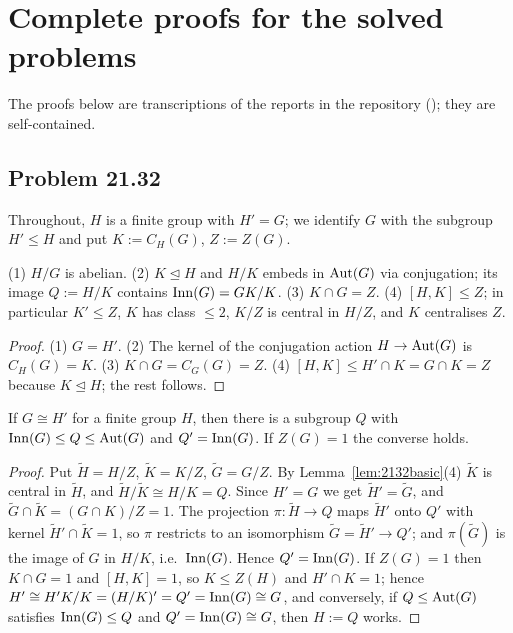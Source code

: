\section{Complete proofs for the solved problems}\label{app:proofs}

The proofs below are transcriptions of the reports in the repository (); they are
self-contained.

\subsection{Problem 21.32}\label{app:2132}

Throughout, $H$ is a finite group with $H'=G$; we identify $G$ with the subgroup $H'\le H$ and put $K:=C_H(G)$,
$Z:=Z(G)$.

\begin{lemma}\label{lem:2132basic}
(1) $H/G$ is abelian. (2) $K\trianglelefteq H$ and $H/K$ embeds in $\operatorname{Aut}(G)$ via conjugation; its image $Q:=H/K$
contains $\operatorname{Inn}(G)=GK/K$. (3) $K\cap G=Z$. (4) $[H,K]\le Z$; in particular $K'\le Z$, $K$ has class $\le 2$, $K/Z$ is
central in $H/Z$, and $K$ centralises $Z$.
\end{lemma}
\begin{proof}
(1) $G=H'$. (2) The kernel of the conjugation action $H\to\operatorname{Aut}(G)$ is $C_H(G)=K$. (3) $K\cap G=C_G(G)=Z$.
(4) $[H,K]\le H'\cap K=G\cap K=Z$ because $K\trianglelefteq H$; the rest follows.
\end{proof}

\begin{theorem}\label{thm:2132B}
If $G\cong H'$ for a finite group $H$, then there is a subgroup $Q$ with $\operatorname{Inn}(G)\le Q\le\operatorname{Aut}(G)$ and
$Q'=\operatorname{Inn}(G)$. If $Z(G)=1$ the converse holds.
\end{theorem}
\begin{proof}
Put $\tilde H=H/Z$, $\tilde K=K/Z$, $\tilde G=G/Z$. By Lemma~\ref{lem:2132basic}(4) $\tilde K$ is central in
$\tilde H$, and $\tilde H/\tilde K\cong H/K=Q$. Since $H'=G$ we get $\tilde H'=\tilde G$, and
$\tilde G\cap\tilde K=(G\cap K)/Z=1$. The projection $\pi:\tilde H\to Q$ maps $\tilde H'$ onto $Q'$ with kernel
$\tilde H'\cap\tilde K=1$, so $\pi$ restricts to an isomorphism $\tilde G=\tilde H'\to Q'$; and $\pi(\tilde G)$
is the image of $G$ in $H/K$, i.e.\ $\operatorname{Inn}(G)$. Hence $Q'=\operatorname{Inn}(G)$.
If $Z(G)=1$ then $K\cap G=1$ and $[H,K]=1$, so $K\le Z(H)$ and $H'\cap K=1$; hence $H'\cong H'K/K=(H/K)'=Q'=\operatorname{Inn}(G)
\cong G$, and conversely, if $Q\le\operatorname{Aut}(G)$ satisfies $\operatorname{Inn}(G)\le Q$ and $Q'=\operatorname{Inn}(G)\cong G$, then $H:=Q$ works.
\end{proof}

